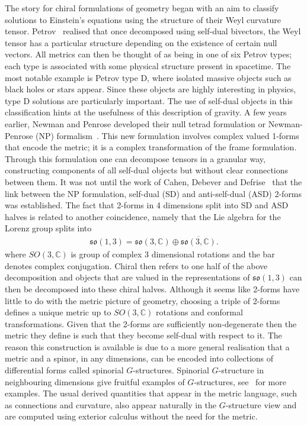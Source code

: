 \documentclass[10pt]{report}
\theoremstyle{definition}
\newcommand{\C}[0]{\mathbb{C}}
\newcommand{\so}{\mathfrak{so}}
\begin{document}
The story for chiral formulations of geometry began with an aim to classify solutions to Einstein's equations using the structure of their Weyl curvature tensor. Petrov~\cite{The_Classificat_Petrov_2000} realised that once decomposed using self-dual bivectors, the Weyl tensor has a particular structure depending on the existence of certain null vectors. All metrics can then be thought of as being in one of six Petrov types; each type is associated with some physical structure present in spacetime. The most notable example is Petrov type D, where isolated massive objects such as black holes or stars appear. Since these objects are highly interesting in physics, type D solutions are particularly important. The use of self-dual objects in this classification hints at the usefulness of this description of gravity. A few years earlier, Newman and Penrose developed their null tetrad formulation or Newman-Penrose (NP) formalism~\cite{An_Approach_to_Newman_1962}. This new formulation involves complex valued 1-forms that encode the metric; it is a complex transformation of the frame formulation. Through this formulation one can decompose tensors in a granular way, constructing components of all self-dual objects but without clear connections between them. It was not until the work of Cahen, Debever and Defrise~\cite{01138a60-03bf-3425-9736-5043c4a7c399} that the link between the NP formulation, self-dual (SD) and anti-self-dual (ASD) 2-forms was established. The fact that 2-forms in 4 dimensions split into SD and ASD halves is related to another coincidence, namely that the Lie algebra for the Lorenz group splits into 
\begin{align}
	\so(1,3) = \so(3,\C) \oplus \overline{\so(3,\C)}. \label{eq:intro-lorentz-chiral-factors}
\end{align}
where $SO(3,\C)$ is group of complex 3 dimensional rotations and the bar denotes complex conjugation.  Chiral then refers to one half of the above decomposition and objects that are valued in the representations of $\so(1,3)$ can then be decomposed into these chiral halves. Although it seems like 2-forms have little to do with the metric picture of geometry, choosing a triple of 2-forms defines a unique metric up to $SO(3,\C)$ rotations and conformal transformations. Given that the 2-forms are sufficiently non-degenerate then the metric they define is such that they become self-dual with respect to it. The reason this construction is available is due to a more general realisation that a metric and a spinor, in any dimensions, can be encoded into collections of differential forms called spinorial $G$-structures. Spinorial $G$-structure in neighbouring dimensions give fruitful examples of $G$-structures, see~\cite{Aspects_of_Spin_Niren_2024,Su2StructureBhoja2024,Lorentzian_Cayl_Krasno_2023} for more examples. The usual derived quantities that appear in the metric language, such as connections and curvature, also appear naturally in the $G$-structure view and are computed using exterior calculus without the need for the metric.
\end{document}
